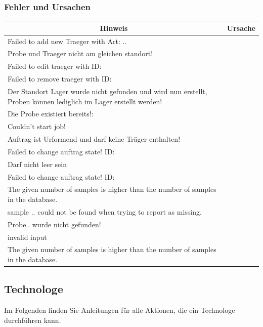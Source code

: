 \documentclass[enabledeprecatedfontcommands,fontsize=12pt,paper=a4,twoside]{scrartcl}
\begin{document}
\subsubsection{Fehler und Ursachen}
\begin{longtable}[c]{|p{5cm}|p{10cm}|}
\hline
\multicolumn{1}{|c|}{\textbf{Hinweis}}                          & \multicolumn{1}{c|}{\textbf{Ursache}}                                                                                                                                                                                                               \\ \hline
\endhead
Failed to add new Traeger with Art: .. & \\ \hline
Probe und Traeger nicht am gleichen standort!& \\ \hline
Failed to edit traeger with ID:  & \\ \hline
Failed to remove traeger with ID: & \\ \hline
Der Standort Lager wurde nicht gefunden und wird nun erstellt, Proben können lediglich im Lager erstellt werden! & \\ \hline
Die Probe existiert bereits!:  & \\ \hline
Couldn't start job!& \\ \hline
Auftrag ist Urformend und darf keine Träger enthalten! & \\ \hline
Failed to change auftrag state! ID:  & \\ \hline
Darf nicht leer sein & \\ \hline
Failed to change auftrag state! ID:  & \\ \hline
The given number of samples is higher than the number of samples in the database. & \\ \hline
sample .. could not be found when trying to report as missing. & \\ \hline
Probe.. wurde nicht gefunden! & \\ \hline
invalid input& \\ \hline
The given number of samples is higher than the number of samples in the database. & \\ \hline
\end{longtable}
\subsection{Technologe}

Im Folgenden finden Sie Anleitungen für alle Aktionen, die ein Technologe durchführen kann. \\
\end{document}
